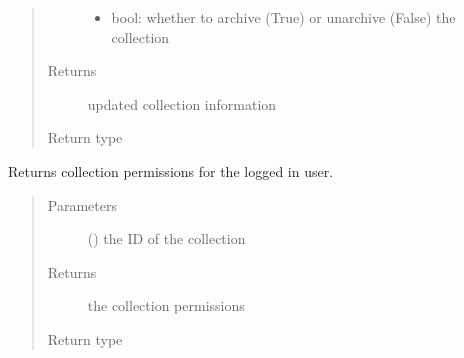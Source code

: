 \documentclass[letterpaper,10pt,english]{sphinxmanual}
\begin{document}
\begin{fulllineitems}
\begin{fulllineitems}
\begin{quote}
\begin{description}
\begin{itemize}
\item {} 
\sphinxAtStartPar
{} \textendash{} bool: whether to archive (True) or unarchive (False) the collection

\end{itemize}

\item[{Returns}] \leavevmode
\sphinxAtStartPar
updated collection information

\item[{Return type}] \leavevmode
\sphinxAtStartPar
{}

\end{description}\end{quote}

\end{fulllineitems}


\begin{fulllineitems}
\label{\detokenize{autoapi/pine/client/index:pine.client.PineClient.get_collection_permissions}}
\sphinxAtStartPar
Returns collection permissions for the logged in user.
\begin{quote}\begin{description}
\item[{Parameters}] \leavevmode
\sphinxAtStartPar
{} () \textendash{} the ID of the collection

\item[{Returns}] \leavevmode
\sphinxAtStartPar
the collection permissions

\item[{Return type}] \leavevmode
\sphinxAtStartPar
{\hyperref[\detokenize{autoapi/pine/client/models/index:pine.client.models.CollectionUserPermissions}]{}}


\end{description}
\end{quote}
\end{fulllineitems}
\end{fulllineitems}
\end{document}
